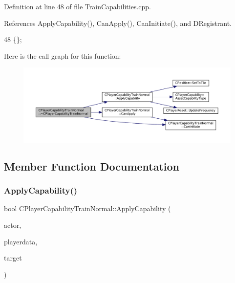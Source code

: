 Definition at line 48 of file Train\+Capabilities.\+cpp.



References Apply\+Capability(), Can\+Apply(), Can\+Initiate(), and D\+Registrant.


\begin{DoxyCode}
48 \{\};
\end{DoxyCode}
Here is the call graph for this function\+:\nopagebreak
\begin{figure}[H]
\begin{center}
\leavevmode
\includegraphics[width=350pt]{classCPlayerCapabilityTrainNormal_a1cc40f48e17f7e7fab3af09a85b4eb0f_cgraph}
\end{center}
\end{figure}


\subsection{Member Function Documentation}
\hypertarget{classCPlayerCapabilityTrainNormal_a04ed166d2072d44ddc96735ac1beb9bc}{}\label{classCPlayerCapabilityTrainNormal_a04ed166d2072d44ddc96735ac1beb9bc} 
\subsubsection{\texorpdfstring{Apply\+Capability()}{ApplyCapability()}}
{\footnotesize\ttfamily bool C\+Player\+Capability\+Train\+Normal\+::\+Apply\+Capability (\begin{DoxyParamCaption}\item[{std\+::shared\+\_\+ptr$<$ \hyperlink{classCPlayerAsset}{C\+Player\+Asset} $>$}]{actor,  }\item[{std\+::shared\+\_\+ptr$<$ \hyperlink{classCPlayerData}{C\+Player\+Data} $>$}]{playerdata,  }\item[{std\+::shared\+\_\+ptr$<$ \hyperlink{classCPlayerAsset}{C\+Player\+Asset} $>$}]{target }\end{DoxyParamCaption})\hspace{0.3cm}{\ttfamily [virtual]}}



